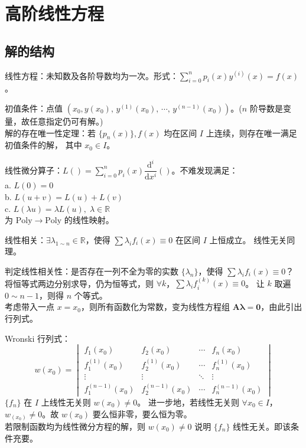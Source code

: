 \documentclass[12pt, a4paper, UTF8, openany]{ctexbook}
\newcommand{\dif}{\mathrm{d}}
\newcommand{\field}[1]{\mathbb{#1}}%
\newcommand{\poly}{\mathrm{Poly}}
\newcommand{\mat}[1]{\mathbf{#1}}
\begin{document}
    \section{高阶线性方程}
        \subsection{解的结构}
        线性方程：未知数及各阶导数均为一次。形式：$\sum\limits_{i = 0}^{n} p_i(x) y^{(i)}(x) = f(x)$。

        初值条件：点值 $(x_0, y(x_0),\, y^{(1)}(x_0),\, \cdots,\, y^{(n - 1)}(x_0))$。($n$ 阶导数是变量，故任意指定仍可有解。)\\
        {\heiti 解的存在唯一性定理}：若 $\{p_n(x)\}, f(x)$ 均在区间 $I$ 上连续，则存在{\heiti 唯一}满足初值条件的解，
        其中 $x_0 \in I$。

        线性微分算子：$L() = \sum\limits_{i = 0}^{n} p_i(x) \dfrac{\dif^i}{\dif x^i} ()$。不难发现满足：\\
        a. $L(0) = 0$\\
        b. $L(u + v) = L(u) + L(v)$\\
        c. $L(\lambda u) = \lambda L(u), \; \lambda \in \field{R}$\\
        为 $\poly \to \poly$ 的线性映射。

        线性相关：$\exists \lambda_{1 \sim n} \in \field{R}$，使得 $\sum \lambda_i f_i(x) \equiv 0$ 在区间 $I$ 上恒成立。
        线性无关同理。

        判定线性相关性：是否存在一列不全为零的实数 $\{\lambda_n\}$，使得 $\sum\lambda_i f_i(x) \equiv 0$？\\
        将恒等式两边分别求导，仍为恒等式，则 $\forall k$，$\sum\lambda_i f_i^{(k)}(x) \equiv 0$。
        让 $k$ 取遍 $0 \sim n - 1$，则得 $n$ 个等式。\\
        考虑带入一点 $x = x_0$，则所有函数化为常数，变为线性方程组 $\mat{A\lambda} = \mat{0}$，由此引出行列式。

        Wronski 行列式：
        {\large $$w(x_0) = 
        \begin{vmatrix}
            f_1(x_0) & f_2(x_0) & \cdots & f_n(x_0) \\
            f_1^{(1)}(x_0) & f_2^{(1)}(x_0) & \cdots & f_n^{(1)}(x_0) \\
            \vdots & \vdots & \ddots & \vdots \\
            f_1^{(n - 1)}(x_0) & f_2^{(n - 1)}(x_0) & \cdots & f_n^{(n - 1)}(x_0)
        \end{vmatrix}$$}
        $\{f_n\}$ 在 $I$ 上线性无关则 $w(x_0) \neq 0$。
        进一步地，若线性无关则 $\forall x_0 \in I$，$w_(x_0) \neq 0$。故 $w(x_0)$ 要么恒非零，要么恒为零。\\
        若{\heiti 限制}函数均为{\heiti 线性微分方程的解}，则 $w(x_0) \neq 0$ 说明 $\{f_n\}$ 线性无关。即该条件{\heiti 充要}。
\end{document}
